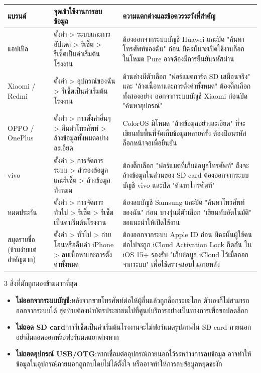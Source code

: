 \begin{center}
\begin{tabularx}{\linewidth}{|X|X|X|}
\hline
\textbf{แบรนด์} & \textbf{จุดเข้าใช้งานการลบข้อมูล} & \textbf{ความแตกต่างและข้อควรระวังที่สำคัญ} \tabularnewline
\hline
แอปเปิล & ตั้งค่า > ระบบและการอัปเดต > รีเซ็ต > รีเซ็ตเป็นค่าเริ่มต้นโรงงาน & ต้องออกจากระบบบัญชี Huawei และปิด "ค้นหาโทรศัพท์ของฉัน" ก่อน มิฉะนั้นจะเปิดใช้งานล็อก ในโหมด Pure อาจต้องมีการยืนยันรหัสผ่าน \tabularnewline
Xiaomi / Redmi & ตั้งค่า > อุปกรณ์ของฉัน > รีเซ็ตเป็นค่าเริ่มต้นโรงงาน & ด้านล่างมีตัวเลือก "ฟอร์แมตการ์ด SD เสมือนจริง" และ "ล้างเนื้อหาและการตั้งค่าทั้งหมด" ต้องติ๊กเลือกทั้งสองอย่าง ออกจากระบบบัญชี Xiaomi ก่อนปิด "ค้นหาอุปกรณ์" \tabularnewline
OPPO / OnePlus & ตั้งค่า > การตั้งค่าอื่นๆ > คืนค่าโทรศัพท์ > ล้างข้อมูลทั้งหมดอย่างละเอียด & ColorOS มีโหมด "ล้างข้อมูลอย่างละเอียด" ที่จะเขียนทับพื้นที่จัดเก็บข้อมูลหลายครั้ง ต้องป้อนรหัสล็อกหน้าจอเพื่อยืนยัน \tabularnewline
vivo & ตั้งค่า > การจัดการระบบ > สำรองข้อมูลและรีเซ็ต > ล้างข้อมูลทั้งหมด & ต้องติ๊กเลือก "ฟอร์แมตที่เก็บข้อมูลโทรศัพท์" ถึงจะล้างข้อมูลในส่วนของ SD card ต้องออกจากระบบบัญชี vivo และปิด "ค้นหาโทรศัพท์" \tabularnewline
หมดประกัน & ตั้งค่า > การจัดการทั่วไป > รีเซ็ต > รีเซ็ตเป็นค่าเริ่มต้นโรงงาน & ต้องลบบัญชี Samsung และปิด "ค้นหาโทรศัพท์ของฉัน" ก่อน บางรุ่นมีตัวเลือก "เขียนทับอัตโนมัติ" ขอแนะนำให้เปิดใช้งาน \tabularnewline
สมุดรายชื่อ (ข้ามง่ายแต่สำคัญมาก) & ตั้งค่า > ทั่วไป > ถ่ายโอนหรือคืนค่า iPhone > ลบเนื้อหาและการตั้งค่าทั้งหมด & ต้องออกจากระบบ Apple ID ก่อน มิฉะนั้นผู้ใช้คนต่อไปจะถูก iCloud Activation Lock กีดกัน ใน iOS 15+ รองรับ "เก็บข้อมูล iCloud ไว้เมื่อออกจากระบบ" เพื่อใช้ตรวจสอบในภายหลัง \tabularnewline
\hline
\end{tabularx}
\end{center}

\begin{tcbwarn}{3 สิ่งที่มักถูกมองข้ามมากที่สุด}
\begin{itemize}
  \item \textbf{ไม่ออกจากระบบบัญชี}:หลังจากขายโทรศัพท์ต่อให้ผู้อื่นแล้วถูกล็อกระยะไกล ตัวเองก็ไม่สามารถออกจากระบบได้ สุดท้ายต้องนำบัตรประชาชนไปที่ศูนย์บริการอย่างเป็นทางการเพื่อขอปลดล็อก
  \item \textbf{ไม่ถอด SD card}การรีเซ็ตเป็นค่าเริ่มต้นโรงงานจะไม่ฟอร์แมตรูปภาพใน SD card ภายนอก อย่าลืมถอดออกหรือฟอร์แมตแยกต่างหาก
  \item \textbf{ไม่ถอดอุปกรณ์ USB/OTG}:หากเชื่อมต่ออุปกรณ์ภายนอกไว้ระหว่างการลบข้อมูล อาจทำให้ข้อมูลในอุปกรณ์ภายนอกถูกลบโดยไม่ได้ตั้งใจ หรืออาจทำให้การลบข้อมูลหยุดชะงัก
\end{itemize}

\end{tcbwarn}

